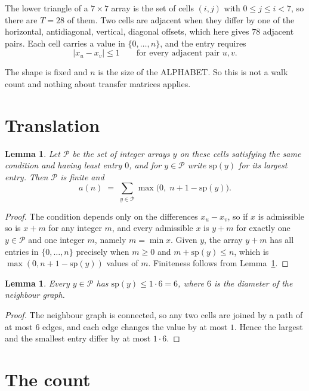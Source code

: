 \documentclass[11pt,a4paper]{article}
\theoremstyle{plain}
\newtheorem{lemma}[theorem]{Lemma}
\theoremstyle{definition}
\begin{document}
The lower triangle of a $7\times7$ array is the set of cells $(i,j)$ with $0\le j\le
i<7$, so there are $T=28$ of them. Two cells are adjacent when they differ by one of the
horizontal, antidiagonal, vertical, diagonal offsets, which here gives $78$ adjacent pairs. Each cell carries a value in
$\{0,\dots,n\}$, and the entry requires
\[
|x_u-x_v|\le 1\qquad\text{for every adjacent pair }u,v .
\]

The shape is fixed and $n$ is the size of the ALPHABET. So this is not a walk count and
nothing about transfer matrices applies.

\section{Translation}

\begin{lemma}\label{lem:trans}
Let $\mathcal P$ be the set of integer arrays $y$ on these cells satisfying the same condition
and having least entry $0$, and for $y\in\mathcal P$ write $\mathrm{sp}(y)$ for its largest
entry. Then $\mathcal P$ is finite and
\[
a(n)\;=\;\sum_{y\in\mathcal P}\max\bigl(0,\;n+1-\mathrm{sp}(y)\bigr).
\]
\end{lemma}

\begin{proof}
The condition depends only on the differences $x_u-x_v$, so if $x$ is admissible so is $x+m$
for any integer $m$, and every admissible $x$ is $y+m$ for exactly one $y\in\mathcal P$ and one
integer $m$, namely $m=\min x$. Given $y$, the array $y+m$ has all entries in
$\{0,\dots,n\}$ precisely when $m\ge0$ and $m+\mathrm{sp}(y)\le n$, which is
$\max(0,n+1-\mathrm{sp}(y))$ values of $m$. Finiteness follows from
Lemma~\ref{lem:bound}.
\end{proof}

\begin{lemma}\label{lem:bound}
Every $y\in\mathcal P$ has $\mathrm{sp}(y)\le 1\cdot6=6$, where $6$ is the
diameter of the neighbour graph.
\end{lemma}

\begin{proof}
The neighbour graph is connected, so any two cells are joined by a path of at most $6$
edges, and each edge changes the value by at most $1$. Hence the largest and the smallest
entry differ by at most $1\cdot6$.
\end{proof}

\section{The count}
\end{document}
